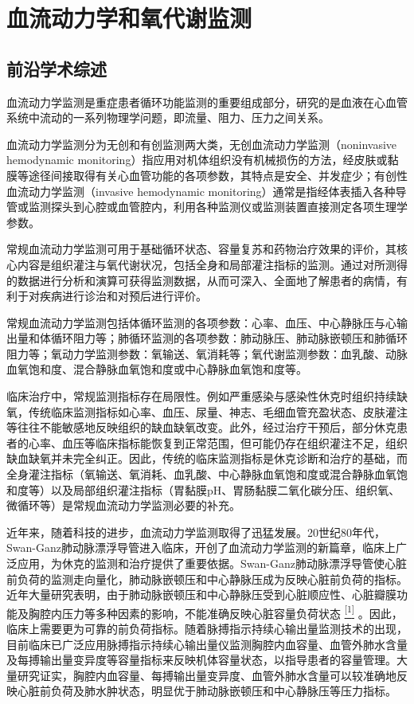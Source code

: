 \chapter{血流动力学和氧代谢监测}

\section{前沿学术综述}

血流动力学监测是重症患者循环功能监测的重要组成部分，研究的是血液在心血管系统中流动的一系列物理学问题，即流量、阻力、压力之间关系。

血流动力学监测分为无创和有创监测两大类，无创血流动力学监测（noninvasive
hemodynamic
monitoring）指应用对机体组织没有机械损伤的方法，经皮肤或黏膜等途径间接取得有关心血管功能的各项参数，其特点是安全、并发症少；有创性血流动力学监测（invasive
hemodynamic
monitoring）通常是指经体表插入各种导管或监测探头到心腔或血管腔内，利用各种监测仪或监测装置直接测定各项生理学参数。

常规血流动力学监测可用于基础循环状态、容量复苏和药物治疗效果的评价，其核心内容是组织灌注与氧代谢状况，包括全身和局部灌注指标的监测。通过对所测得的数据进行分析和演算可获得监测数据，从而可深入、全面地了解患者的病情，有利于对疾病进行诊治和对预后进行评价。

常规血流动力学监测包括体循环监测的各项参数：心率、血压、中心静脉压与心输出量和体循环阻力等；肺循环监测的各项参数：肺动脉压、肺动脉嵌顿压和肺循环阻力等；氧动力学监测参数：氧输送、氧消耗等；氧代谢监测参数：血乳酸、动脉血氧饱和度、混合静脉血氧饱和度或中心静脉血氧饱和度等。

临床治疗中，常规监测指标存在局限性。例如严重感染与感染性休克时组织持续缺氧，传统临床监测指标如心率、血压、尿量、神志、毛细血管充盈状态、皮肤灌注等往往不能敏感地反映组织的缺血缺氧改变。此外，经过治疗干预后，部分休克患者的心率、血压等临床指标能恢复到正常范围，但可能仍存在组织灌注不足，组织缺血缺氧并未完全纠正。因此，传统的临床监测指标是休克诊断和治疗的基础，而全身灌注指标（氧输送、氧消耗、血乳酸、中心静脉血氧饱和度或混合静脉血氧饱和度等）以及局部组织灌注指标（胃黏膜pH、胃肠黏膜二氧化碳分压、组织氧、微循环等）是常规血流动力学监测必要的补充。

近年来，随着科技的进步，血流动力学监测取得了迅猛发展。20世纪80年代，Swan-Ganz肺动脉漂浮导管进入临床，开创了血流动力学监测的新篇章，临床上广泛应用，为休克的监测和治疗提供了重要依据。Swan-Ganz肺动脉漂浮导管使心脏前负荷的监测走向量化，肺动脉嵌顿压和中心静脉压成为反映心脏前负荷的指标。近年大量研究表明，由于肺动脉嵌顿压和中心静脉压受到心脏顺应性、心脏瓣膜功能及胸腔内压力等多种因素的影响，不能准确反映心脏容量负荷状态
\protect\hyperlink{text00010.htmlux5cux23ch1-9}{\textsuperscript{{[}1{]}}}
。因此，临床上需要更为可靠的前负荷指标。随着脉搏指示持续心输出量监测技术的出现，目前临床已广泛应用脉搏指示持续心输出量仪监测胸腔内血容量、血管外肺水含量及每搏输出量变异度等容量指标来反映机体容量状态，以指导患者的容量管理。大量研究证实，胸腔内血容量、每搏输出量变异度、血管外肺水含量可以较准确地反映心脏前负荷及肺水肿状态，明显优于肺动脉嵌顿压和中心静脉压等压力指标。

